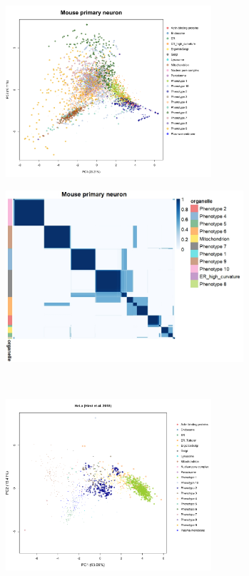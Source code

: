 \documentclass[12pt,english]{article}
\begin{document}
\begin{figure}
	\begin{subfigure}[t]{0.5\textwidth}
	\centering
	\includegraphics[height=2.5in]{pcaItzhak2017.pdf}
	\caption{}
\end{subfigure}
\begin{subfigure}[t]{0.5\textwidth}
	\centering
	\includegraphics[height=2.5in]{heatmapItzhak2017.jpeg}
	\caption{}
\end{subfigure}
~
\begin{subfigure}[t]{0.5\textwidth}
	\centering
	\includegraphics[height=2.5in]{pcaHirst.pdf}
	\caption{}
\end{subfigure}
\begin{subfigure}[t]{0.5\textwidth}

\end{subfigure}
\end{figure}
\end{document}
